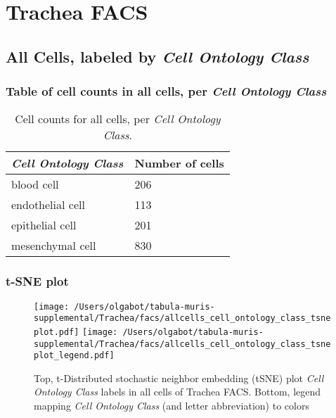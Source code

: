 \clearpage
\section{Trachea FACS}

\subsection{All Cells, labeled by \emph{Cell Ontology Class}}
\subsubsection{Table of cell counts in all cells, per \emph{Cell Ontology Class}}\begin{table}[h]
\centering
\label{my-label}
\begin{tabular}{@{}ll@{}}
\toprule

\emph{Cell Ontology Class}& Number of cells \\ \midrule
blood cell & 206 \\

endothelial cell & 113 \\

epithelial cell & 201 \\

mesenchymal cell & 830 \\
\bottomrule
\end{tabular}
\caption{Cell counts for all cells, per \emph{Cell Ontology Class}.}
\end{table}

\clearpage
\subsubsection{t-SNE plot}
\begin{figure}[h]
\centering
\texttt{[image: /Users/olgabot/tabula-muris-supplemental/Trachea/facs/allcells\_cell\_ontology\_class\_tsneplot.pdf]}
\texttt{[image: /Users/olgabot/tabula-muris-supplemental/Trachea/facs/allcells\_cell\_ontology\_class\_tsneplot\_legend.pdf]}
\caption{Top, t-Distributed stochastic neighbor embedding (tSNE) plot  \emph{Cell Ontology Class} labels in all cells of Trachea FACS. Bottom, legend mapping \emph{Cell Ontology Class} (and letter abbreviation) to colors}
\end{figure}


\clearpage

